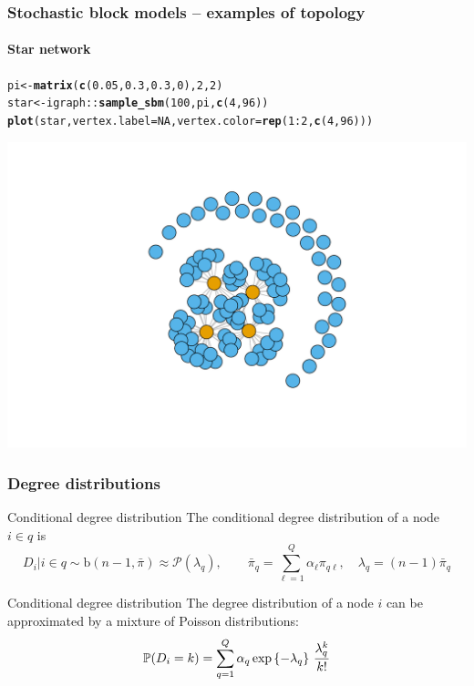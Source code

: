 \documentclass{beamer}\usepackage[]{graphicx}\usepackage[]{color}
\makeatletter
\newcommand{\hlnum}[1]{\textcolor[rgb]{0.686,0.059,0.569}{#1}}%
\newcommand{\hlopt}[1]{\textcolor[rgb]{0,0,0}{#1}}%
\newcommand{\hlstd}[1]{\textcolor[rgb]{0.345,0.345,0.345}{#1}}%
\newcommand{\hlkwb}[1]{\textcolor[rgb]{0.69,0.353,0.396}{#1}}%
\newcommand{\hlkwc}[1]{\textcolor[rgb]{0.333,0.667,0.333}{#1}}%
\newcommand{\hlkwd}[1]{\textcolor[rgb]{0.737,0.353,0.396}{\textbf{#1}}}%
\newenvironment{kframe}{%
 \def\at@end@of@kframe{}%
 \ifinner\ifhmode%
  \def\at@end@of@kframe{\end{minipage}}%
  \begin{minipage}{\columnwidth}%
 \fi\fi%
 \def\FrameCommand##1{\hskip\@totalleftmargin \hskip-\fboxsep
 \colorbox{shadecolor}{##1}\hskip-\fboxsep
     \hskip-\linewidth \hskip-\@totalleftmargin \hskip\columnwidth}%
 \MakeFramed {\advance\hsize-\width
   \@totalleftmargin\z@ \linewidth\hsize
   \@setminipage}}%
 {\par\unskip\endMakeFramed%
 \at@end@of@kframe}
\newenvironment{knitrout}{}{} %
\makeatother
\begin{document}
\begin{frame}[fragile]
  \frametitle{Stochastic block models -- examples of topology}
  \framesubtitle{Star network}

\begin{knitrout}\scriptsize
{}\color{fgcolor}\begin{kframe}
\begin{alltt}
\hlstd{pi} \hlkwb{<-} \hlkwd{matrix}\hlstd{(}\hlkwd{c}\hlstd{(}\hlnum{0.05}\hlstd{,}\hlnum{0.3}\hlstd{,}\hlnum{0.3}\hlstd{,}\hlnum{0}\hlstd{),}\hlnum{2}\hlstd{,}\hlnum{2}\hlstd{)}
\hlstd{star} \hlkwb{<-} \hlstd{igraph}\hlopt{::}\hlkwd{sample_sbm}\hlstd{(}\hlnum{100}\hlstd{, pi,} \hlkwd{c}\hlstd{(}\hlnum{4}\hlstd{,} \hlnum{96}\hlstd{))}
\hlkwd{plot}\hlstd{(star,} \hlkwc{vertex.label}\hlstd{=}\hlnum{NA}\hlstd{,} \hlkwc{vertex.color} \hlstd{=} \hlkwd{rep}\hlstd{(}\hlnum{1}\hlopt{:}\hlnum{2}\hlstd{,}\hlkwd{c}\hlstd{(}\hlnum{4}\hlstd{,}\hlnum{96}\hlstd{)))}
\end{alltt}
\end{kframe}
\includegraphics[width=.8\textwidth]{figures/unnamed-chunk-7-1} 

\end{knitrout}

\end{frame}

\begin{frame}
  \frametitle{Degree distributions}

  \begin{block}{Conditional degree distribution}
    The conditional degree distribution of a node $i\in q$ is
    \begin{equation*}
      D_i | i \in q \sim \mathrm{b}(n-1,\bar\pi) \approx \mathcal{P}(\lambda_q), \qquad \bar\pi_q = \sum_{\ell=1}^Q \alpha_\ell \pi_{q\ell}, \quad \lambda_q = (n-1)\bar\pi_q
    \end{equation*}
  \end{block}

  \vfill

  \begin{block}{Conditional degree distribution}
    The degree distribution of a node $i$ can be approximated by a mixture of Poisson distributions:
    \begin{equation*}
      \mathbb{P}(D_i = k) = \sum_{q=1}^Q\alpha_q \exp{\left\{-\lambda_q\right\}} \ \frac{\lambda_q^k}{k !}
    \end{equation*}
  \end{block}

\end{frame}
\end{document}
